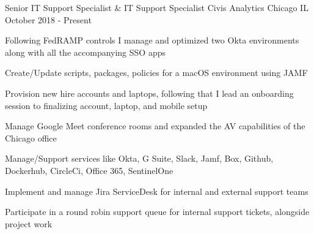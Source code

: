 

\begin{cventries}

  \cventry
  {Senior IT Support Specialist \& IT Support Specialist} %
  {Civis Analytics} %
  {Chicago IL} %
  {October 2018 - Present} %
  {
    \begin{cvitems} %
      \item {Following FedRAMP controls I manage and optimized two Okta environments along with all the accompanying SSO apps}
      \item {Create/Update scripts, packages, policies for a macOS environment using JAMF}
      \item {Provision new hire accounts and laptops, following that I lead an onboarding session to finalizing account, laptop, and mobile setup}
      \item {Manage Google Meet conference rooms and expanded the AV capabilities of the Chicago office}      
      \item {Manage/Support services like Okta, G Suite, Slack, Jamf, Box, Github, Dockerhub, CircleCi, Office 365, SentinelOne}
      \item {Implement and manage Jira ServiceDesk for internal and external support teams}
      \item {Participate in a round robin support queue for internal support tickets, alongside project work}
    \end{cvitems}
  }


\end{cventries}
